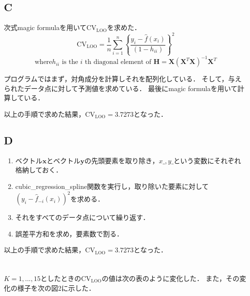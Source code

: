 \documentclass[dvipdfmx]{ujarticle}
\begin{document}
\subsection*{C}
次式magic formulaを用いて$\mathrm{CV}_{\mathrm{LOO}}$を求めた．
\begin{equation}
\mathrm{CV}_{\mathrm{LOO}}=\frac{1}{n} \sum_{i=1}^{n}\left\{\frac{y_{i}-\hat{f}{\left(x_{i}\right)}}{\left(1-h_{i i}\right)}\right\}^{2}　\tag{magic formula}
\end{equation}
\begin{equation}
\text{where} h_{i i} \text { is the } i \text { th diagonal element of } \mathbf{H}=\mathbf{X}\left(\mathbf{X}^{T} \mathbf{X}\right)^{-1} \mathbf{X}^{T}
\end{equation}

プログラムではまず，対角成分を計算しそれを配列化している．
そして，与えられたデータ点に対して予測値を求めている．
最後にmagic formulaを用いて計算している．

以上の手順で求めた結果，\underline{$\mathrm{CV}_{\mathrm{LOO}}=3.7273$}となった．

\subsection*{D}

\begin{enumerate}
  \item ベクトル$\boldsymbol{x}$とベクトル$\boldsymbol{y}$の先頭要素を取り除き，$x\_, y\_$という変数にそれぞれ格納しておく．
  \item cubic\_regression\_spline関数を実行し，取り除いた要素に対して$\left(y_{i}-\hat{f}_{-i}\left(x_{i}\right)\right)^{2}$を求める．
  \item それをすべてのデータ点について繰り返す．
  \item 誤差平方和を求め，要素数で割る．
\end{enumerate}

以上の手順で求めた結果，\underline{$\mathrm{CV}_{\mathrm{LOO}}=3.7273$}となった．

\clearpage
\section{}
$K=1,...,15$としたときの$\mathrm{CV_{LOO}}$の値は次の表のように変化した．
また，その変化の様子を次の図2に示した．

\begin{table}[htbp]
\centering
{}
\end{table}
\end{document}
